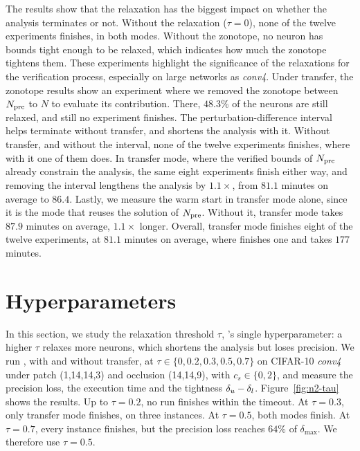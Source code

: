 The results show that the relaxation has the biggest impact on whether
the analysis terminates or not. Without the relaxation ($\tau{=}0$),
none of the twelve experiments finishes, in both modes.
Without the zonotope, no neuron has bounds tight enough to be relaxed,
which indicates how much the zonotope tightens them. These experiments
highlight the significance of the relaxations for the verification process,
especially on large networks as \emph{conv4}.
Under transfer, the zonotope results show an experiment where we removed the
zonotope between $N_{\mathrm{pre}}$ to $N$ to evaluate its contribution.
There, $48.3\%$ of the neurons are still relaxed,
and still no experiment finishes.
The perturbation-difference interval helps \tool terminate without
transfer, and shortens the analysis with it. Without transfer, and
without the interval, none of the twelve experiments finishes, where
with it one of them does. In transfer mode, where the verified bounds
of $N_{\mathrm{pre}}$ already constrain the analysis, the same eight experiments
finish either way, and removing the interval lengthens the analysis by
$1.1\times$, from $81.1$ minutes on average to $86.4$.
Lastly, we measure the warm start in transfer mode alone, since it is
the mode that reuses the solution of $N_{\mathrm{pre}}$. Without it, transfer
mode takes $87.9$ minutes on average, $1.1\times$ longer. Overall,
transfer mode finishes eight of the twelve experiments, at $81.1$
minutes on average, where \tool finishes one and takes $177$ minutes.





\section{Hyperparameters}
\label{sec:evaluation-hyperparameters}

In this section, we study the relaxation threshold $\tau$, \tool's
single hyperparameter: a higher $\tau$ relaxes more neurons, which
shortens the analysis but loses precision. We run \tool, with and
without transfer, at $\tau\in\{0,0.2,0.3,0.5,0.7\}$ on CIFAR-10
\emph{conv4} under patch (1,14,14,3) and occlusion (14,14,9), with
$c_s\in\{0,2\}$, and measure the precision loss, the execution time and
the tightness $\delta_u-\delta_l$. Figure~\ref{fig:n2-tau} shows the results.
Up to $\tau=0.2$, no run finishes within the timeout. At $\tau=0.3$,
only transfer mode finishes, on three instances. At $\tau=0.5$, both
modes finish. At $\tau=0.7$, every instance finishes, but the precision
loss reaches $64\%$ of $\delta_{\max}$. We therefore use $\tau=0.5$.

